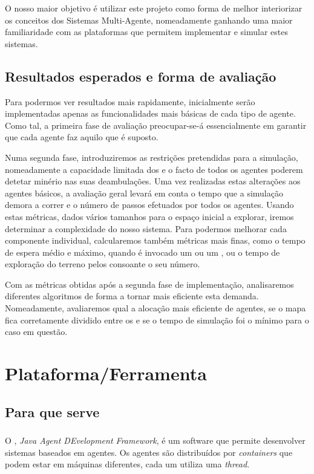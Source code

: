 \documentclass[12pt]{report}
\begin{document}
O nosso maior objetivo é utilizar este projeto como forma de melhor interiorizar os conceitos dos Sistemas Multi-Agente, nomeadamente ganhando uma maior familiaridade com as plataformas que permitem implementar e simular estes sistemas.

\section{Resultados esperados e forma de avaliação}

Para podermos ver resultados mais rapidamente, inicialmente serão implementadas apenas as funcionalidades mais básicas de cada tipo de agente. Como tal, a primeira fase de avaliação preocupar-se-á essencialmente em garantir que cada agente faz aquilo que é suposto.

Numa segunda fase, introduziremos as restrições pretendidas para a simulação, nomeadamente a capacidade limitada dos \transporters e o facto de todos os agentes poderem detetar minério nas suas deambulações. Uma vez realizadas estas alterações aos agentes básicos, a avaliação geral levará em conta o tempo que a simulação demora a correr e o número de passos efetuados por todos os agentes. Usando estas métricas, dados vários tamanhos para o espaço inicial a explorar, iremos determinar a complexidade do nosso sistema. Para podermos melhorar cada componente individual, calcularemos também métricas mais finas, como o tempo de espera médio e máximo, quando é invocado um \producer ou um \transporter, ou o tempo de exploração do terreno pelos \spotters consoante o seu número.

Com as métricas obtidas após a segunda fase de implementação, analisaremos diferentes algoritmos de forma a tornar mais eficiente esta demanda. Nomeadamente, avaliaremos qual a alocação mais eficiente de agentes, se o mapa fica corretamente dividido entre os \spotters e se o tempo de simulação foi o mínimo para o caso em questão.


\chapter{Plataforma/Ferramenta}

\section{Para que serve}

  \subsection{\jade}
  O \jade, \emph{Java Agent DEvelopment Framework}, é um software que permite desenvolver sistemas baseados em agentes. Os agentes são distribuídos por \emph{containers} que podem estar em máquinas diferentes, cada um utiliza uma \emph{thread}. 
\end{document}
